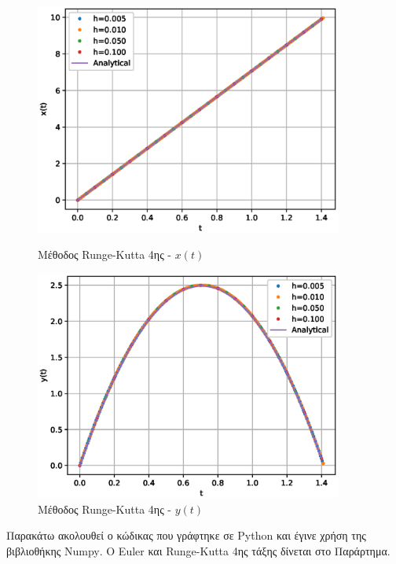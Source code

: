 \documentclass[assignment4.tex]{subfiles}
\begin{document}
\begin{figure}[hp]
	\includegraphics[width=0.9\textwidth]{ex2RungeKutta_x.eps}
	\centering
	\caption{Mέθοδος \textlatin{Runge-Kutta} 4ης - $x(t)$}
	\label{fig:ex2RungeKutta_x}
	\includegraphics[width=0.9\textwidth]{ex2RungeKutta_y.eps}
	\centering
	\caption{Mέθοδος \textlatin{Runge-Kutta} 4ης - $y(t)$}
	\label{fig:ex2RungeKutta_y}
\end{figure}

Παρακάτω ακολουθεί ο κώδικας που γράφτηκε σε \textlatin{Python} και έγινε χρήση της βιβλιοθήκης \textlatin{Numpy}. Ο \textlatin{Euler} και \textlatin{Runge-Kutta} 4ης τάξης δίνεται στο Παράρτημα.

\end{document}
